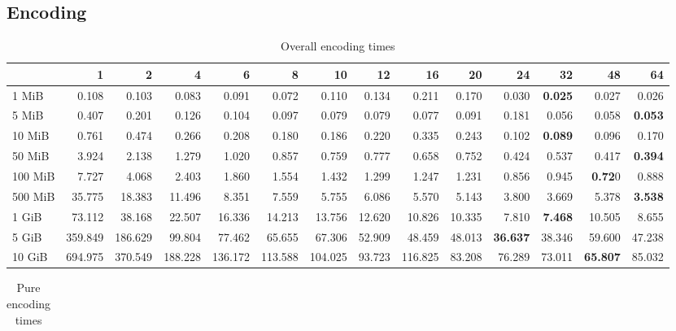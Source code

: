 
\subsection{Encoding}
\begin{centering}
\begin{table}[!h]
	\caption{Overall encoding times}
	\begin{tabular}{lrrrrrrrrrrrrr}
		\toprule
		\diagbox[width=7em]{Size}{Threads} &      1  &      2  &      4  &      6  &      8  &      10 &     12 &      16 &     20 &     24 &     32 &     48 &     64 \\
		\midrule
		1 MiB   &   0.108 &   0.103 &   0.083 &   0.091 &   0.072 &   0.110 &  0.134 &   0.211 &  0.170 &  0.030 &  \textbf{0.025} &  0.027 &  0.026 \\
		5 MiB   &   0.407 &   0.201 &   0.126 &   0.104 &   0.097 &   0.079 &  0.079 &   0.077 &  0.091 &  0.181 &  0.056 &  0.058 &  \textbf{0.053} \\
		10 MiB  &   0.761 &   0.474 &   0.266 &   0.208 &   0.180 &   0.186 &  0.220 &   0.335 &  0.243 &  0.102 &  \textbf{0.089} &  0.096 &  0.170 \\
		50 MiB  &   3.924 &   2.138 &   1.279 &   1.020 &   0.857 &   0.759 &  0.777 &   0.658 &  0.752 &  0.424 &  0.537 &  0.417 &  \textbf{0.394} \\
		100 MiB &   7.727 &   4.068 &   2.403 &   1.860 &   1.554 &   1.432 &  1.299 &   1.247 &  1.231 &  0.856 &  0.945 &  \textbf{0.72}0 &  0.888 \\
		500 MiB &  35.775 &  18.383 &  11.496 &   8.351 &   7.559 &   5.755 &  6.086 &   5.570 &  5.143 &  3.800 &  3.669 &  5.378 &  \textbf{3.538} \\
		1 GiB   &  73.112 &  38.168 &  22.507 &  16.336 &  14.213 &  13.756 & 12.620 &  10.826 & 10.335 &  7.810 &  \textbf{7.468} & 10.505 &  8.655 \\
		5 GiB   & 359.849 & 186.629 &  99.804 &  77.462 &  65.655 &  67.306 & 52.909 &  48.459 & 48.013 & \textbf{36.637} & 38.346 & 59.600 & 47.238 \\
		10 GiB  & 694.975 & 370.549 & 188.228 & 136.172 & 113.588 & 104.025 & 93.723 & 116.825 & 83.208 & 76.289 & 73.011 & \textbf{65.807} & 85.032 \\
		\bottomrule
	\end{tabular}
\end{table}
\begin{table}[!h]
	\caption{Pure encoding times}
	\begin{tabular}{lrrrrrrrrrrrrr}
		\toprule

\end{tabular}
\end{table}
\end{centering}
